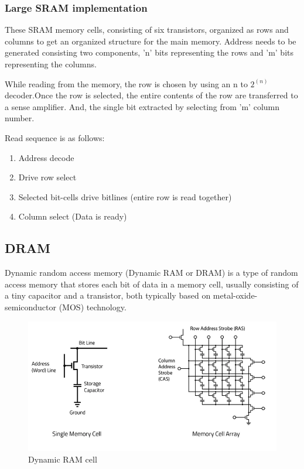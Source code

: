 \subsubsection{Large SRAM implementation}
These SRAM memory cells, consisting of six transistors, organized as rows and columns to get an organized structure for the main memory. Address needs to be generated consisting two components, \ie 'n' bits representing the rows and 'm' bits representing the columns. 

\par While reading from the memory, the row is chosen by using an n to \(2^(n)\) decoder.Once the row is selected, the entire contents of the row are transferred to a sense amplifier. And, the single bit extracted by selecting from 'm' column number.

\par Read sequence is as follows:
\begin{enumerate}
    \item Address decode
    \item Drive row select
    \item Selected bit-cells drive bitlines (entire row is read together)
    \item Column select (Data is ready)
\end{enumerate}

\subsection{DRAM}
Dynamic random access memory (Dynamic RAM or DRAM) is a type of random access memory that stores each bit of data in a memory cell, usually consisting of a tiny capacitor and a transistor, both typically based on metal-oxide-semiconductor (MOS) technology. 

\begin{figure}[H]
	\begin{center}
		\includegraphics[width=5in]{images/DRAMCell.png}
		\caption{Dynamic RAM cell}
		\label{DRAMCell}
	\end{center}
\end{figure}

